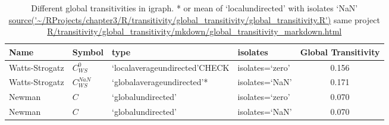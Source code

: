 \begin{table}[ht]
\centering
\begin{adjustbox}{width=\textwidth}
\begin{tabular}{llllc}
  \toprule
Name & Symbol &  type & isolates & Global Transitivity \\ 
  \midrule
Watts-Strogatz & $C_{WS}^{0}$& `localaverageundirected'CHECK
 &isolates=`zero' & 0.156\vspace{1mm} \\ 

Watts-Strogatz & $C_{WS}^{NaN}$ &`globalaverageundirected'*&isolates=`NaN' & 0.171\vspace{1mm} \\ 
  Newman &$C$&`globalundirected' &isolates=`zero'& 0.070\vspace{1mm} \\ 
  Newman &$C$&`globalundirected'&isolates=`NaN'& 0.070 \\ 
   \bottomrule
\end{tabular}
\end{adjustbox}
\caption[Different global transitivities in igraph]{Different global transitivities in igraph. * or mean of `localundirected' with isolates `NaN' 
\tiny\url{source('~/RProjects/chapter3/R/transitivity/global_transitivity/global_transitivity.R')} 
\tiny same project \url{R/transitivity/global_transitivity/mkdown/global_transitivity_markdown.html}} 
\label{tab:Different global transitivities in igraph}
\end{table}




